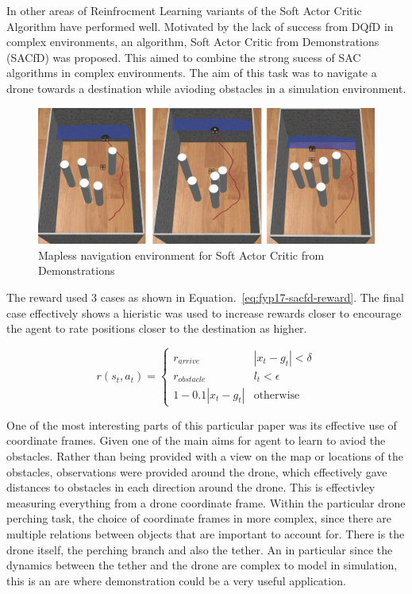 
In other areas of Reinfrocment Learning variants of the Soft Actor Critic Algorithm have performed well.
Motivated by the lack of success from DQfD in complex environments, an algorithm, Soft Actor Critic from Demonstrations (SACfD) was proposed\cite{SACfDMaplessNavigation}.
This aimed to combine the strong sucess of SAC algorithms in complex environments.
The aim of this task was to navigate a drone towards a destination while avioding obstacles in a simulation environment.

\begin{figure}[htbp]
  \centering
  \includegraphics[width=\textwidth]{background/fyp17-sacfd.png}
  \caption{Mapless navigation environment for Soft Actor Critic from Demonstrations}
\label{fig:fyp17-sacfd}
\end{figure}

The reward used 3 cases as shown in Equation.~\ref*{eq:fyp17-sacfd-reward}. 
The final case effectively shows a hieristic was used to increase rewards closer to encourage the agent to rate positions closer to the destination as higher.

\begin{equation}
  r(s_{t}, a_{t}) =
  \begin{cases} 
    r_{arrive} & |x_{t} - g_{t}| < \delta \\
    r_{obstacle} & l_{t} < \epsilon \\
    1-0.1 |x_{t} - g_{t}| & \text{otherwise}
  \end{cases}
  \label{eq:fyp17-sacfd-reward}
\end{equation}

One of the most interesting parts of this particular paper was its effective use of coordinate frames.
Given one of the main aims for agent to learn to aviod the obstacles.
Rather than being provided with a view on the map or locations of the obstacles, observations were provided around the drone, which effectively gave distances to obstacles in each direction around the drone.
This is effectivley measuring everything from a drone coordinate frame.
Within the particular drone perching task, the choice of coordinate frames in more complex, since there are multiple relations between objects that are important to account for.
There is the drone itself, the perching branch and also the tether.
An in particular since the dynamics between the tether and the drone are complex to model in simulation, this is an are where demonstration could be a very useful application.

